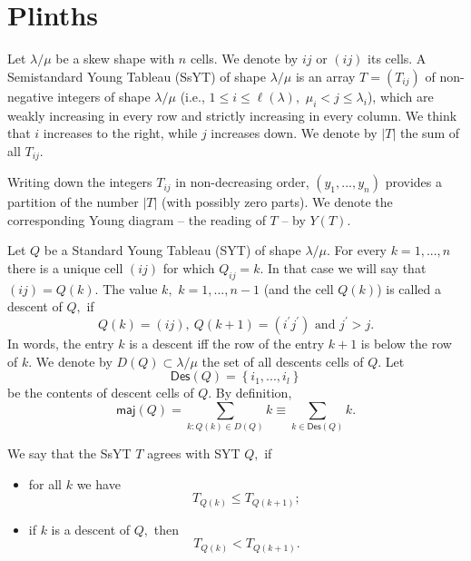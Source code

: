 \documentclass[12pt]{article}%
\begin{document}
\section{Plinths}

Let $\lambda/\mu$ be a skew shape with $n$ cells. We denote by $ij$ or
$\left(  ij\right)  $ its cells. A Semistandard Young Tableau (SsYT) of shape
$\lambda/\mu$ is an array $T=\left(  T_{ij}\right)  $ of non-negative integers
of shape $\lambda/\mu$ (i.e., $1\leq i\leq\ell\left(  \lambda\right)  ,$
$\mu_{i}<j\leq\lambda_{i}$), which are weakly increasing in every row and
strictly increasing in every column. We think that $i$ increases to the right,
while $j$ increases down. We denote by $\left\vert T\right\vert $ the sum of
all $T_{ij}.$

Writing down the integers $T_{ij}$ in non-decreasing order, $\left(
y_{1},...,y_{n}\right)  $ provides a partition of the number $\left\vert
T\right\vert $ (with possibly zero parts). We denote the corresponding Young
diagram -- the reading of $T$ -- by $Y\left(  T\right)  .$

Let $Q$ be a Standard Young Tableau (SYT) of shape $\lambda/\mu.$ For every
$k=1,...,n$ there is a unique cell $\left(  ij\right)  $ for which $Q_{ij}=k.$
In that case we will say that $\left(  ij\right)  =Q\left(  k\right)  .$ The
value $k,$ $k=1,...,n-1$ (and the cell $Q\left(  k\right)  $) is called a
descent of $Q,$ if
\begin{equation}
Q\left(  k\right)  =\left(  ij\right)  ,\ Q\left(  k+1\right)  =\left(
i^{\prime}j^{\prime}\right)  \text{ and }j^{\prime}>j. \label{48}%
\end{equation}
In words, the entry $k$ is a descent iff the row of the entry $k+1$ is below
the row of $k.$ We denote by $D\left(  Q\right)  \subset\lambda/\mu$ the set
of all descents cells of $Q$. Let
\begin{equation}
\mathsf{Des}\left(  Q\right)  =\left\{  i_{1},...,i_{l}\right\}  \label{49}%
\end{equation}
be the contents of descent cells of $Q.$ By definition,%
\begin{equation}
\mathsf{maj}\left(  Q\right)  =\sum_{k:Q\left(  k\right)  \in D\left(
Q\right)  }k\equiv\sum_{k\in\mathsf{Des}\left(  Q\right)  }k. \label{44}%
\end{equation}


We say that the SsYT $T$ agrees with SYT $Q,$ if

\begin{itemize}
\item for all $k$ we have%
\begin{equation}
T_{Q\left(  k\right)  }\leq T_{Q\left(  k+1\right)  }; \label{61}%
\end{equation}


\item if $k$ is a descent of $Q,$ then
\begin{equation}
T_{Q\left(  k\right)  }<T_{Q\left(  k+1\right)  }. \label{62}%
\end{equation}

\end{itemize}
\end{document}
